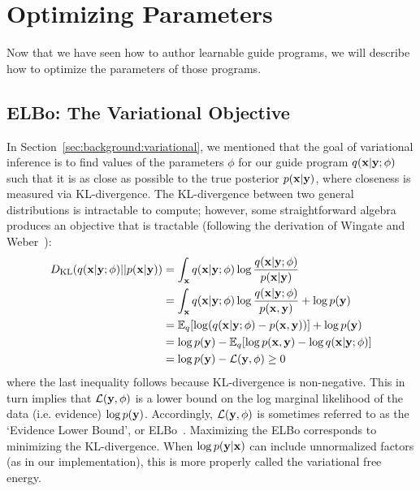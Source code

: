 
\section{Optimizing Parameters}
\label{sec:optimization}

Now that we have seen how to author learnable guide programs, we will describe how to optimize the parameters of those programs. 

\subsection{ELBo: The Variational Objective}

In Section~\ref{sec:background:variational}, we mentioned that the goal of variational inference is to find values of the parameters $\phi$ for our guide program $q(\mathbf{x} | \mathbf{y} ; \phi)$ such that it is as close as possible to the true posterior $p(\mathbf{x} | \mathbf{y})$, where closeness is measured via KL-divergence. The KL-divergence between two general distributions is intractable to compute; however, some straightforward algebra produces an objective that is tractable (following the derivation of Wingate and Weber~\cite{AVIPP}):
\begin{align}
\begin{split}
D_{\text{KL}}(q(\mathbf{x} | \mathbf{y} ; \phi) || p(\mathbf{x} | \mathbf{y}))
&= \int_{\mathbf{x}} q(\mathbf{x} | \mathbf{y} ; \phi) \log \frac{q(\mathbf{x} | \mathbf{y} ; \phi)}{p(\mathbf{x} | \mathbf{y})}\\
&= \int_{\mathbf{x}} q(\mathbf{x} | \mathbf{y} ; \phi) \log \frac{q(\mathbf{x} | \mathbf{y} ; \phi)}{p(\mathbf{x}, \mathbf{y})} + \log p(\mathbf{y})\\
&= \mathbb{E}_{q}[ \log(q(\mathbf{x} | \mathbf{y} ; \phi) -  p(\mathbf{x}, \mathbf{y}) ) ] + \log p(\mathbf{y})\\
&= \log p(\mathbf{y}) - \mathbb{E}_{q}[ \log p(\mathbf{x}, \mathbf{y}) - \log q(\mathbf{x} | \mathbf{y} ; \phi) ]\\
&= \log p(\mathbf{y}) - \mathcal{L}(\mathbf{y}, \phi) \geq 0
\end{split}
\label{eq:elbo}
\end{align}
where the last inequality follows because KL-divergence is non-negative. This in turn implies that $\mathcal{L}(\mathbf{y}, \phi)$ is a lower bound on the log marginal likelihood of the data (i.e. evidence) $\log p(\mathbf{y})$. Accordingly, $\mathcal{L}(\mathbf{y}, \phi)$ is sometimes referred to as the `Evidence Lower Bound', or ELBo~\cite{BBVI}. Maximizing the ELBo corresponds to minimizing the KL-divergence.
When $\log p(\mathbf{y} | \mathbf{x})$ can include unnormalized factors (as in our implementation), this is more properly called the variational free energy.

